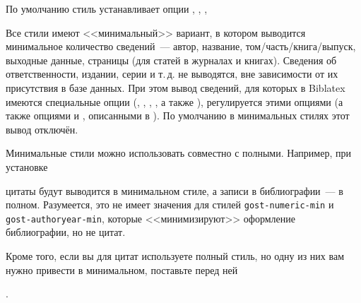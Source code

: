 \documentclass[10pt,a4paper,headings=small,numbers=enddot,english,russian]{ltxdockit}
\newcommand*{\biblatex}{Biblatex\xspace}
\newcommand*{\bibsty}{\texttt}
\begin{document}
\begin{marglist}
По умолчанию стиль устанавливает опции
,
,
,

\item[gost-inline-min]%
\item[gost-footnote-min]\vspace{-\itemsep}\vspace{-\parsep}%
\item[gost-numeric-min]\vspace{-\itemsep}\vspace{-\parsep}%
\item[gost-authoryear-min]\vspace{-\itemsep}\vspace{-\parsep}%
\item[gost-alphabetic-min]\vspace{-\itemsep}\vspace{-\parsep}%
\item\vspace{-\itemsep}\vspace{-\parsep}%
\vspace{-4\baselineskip}%
Все стили имеют <<минимальный>> вариант, в котором выводится минимальное количество
сведений~--- автор, название, том\slash часть\slash книга\slash выпуск,
выходные данные, страницы (для статей в журналах и книгах).
Сведения об ответственности, издании, серии и т.\,д. не выводятся, вне зависимости от их присутствия в базе данных.
При этом вывод сведений, для которых в \biblatex имеются специальные опции
(, , , , а также ), регулируется
этими опциями (а также опциями  и ,
описанными в ). По умолчанию в минимальных стилях этот вывод отключён.

Минимальные стили можно использовать совместно с полными.
Например, при установке

\begin{ltxcode}
\usepackage[%
    citestyle=gost-footnote-min,
    bibstyle=gost-footnote,
    ...
]{biblatex}
\end{ltxcode}

цитаты будут выводится в минимальном стиле, а записи в библиографии~--- в полном.
Разумеется, это не имеет значения для стилей \bibsty{gost-numeric-min} и
\bibsty{gost-authoryear-min}, которые <<минимизируют>> оформление библиографии, но не цитат.

Кроме того, если вы для цитат используете полный стиль, но одну из них вам нужно привести
в минимальном, поставьте перед ней

\begin{ltxcode}
.
\end{ltxcode}

\end{marglist}
\end{document}
